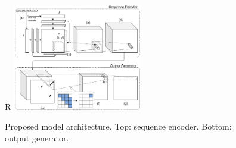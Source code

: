 \documentclass{article}
\begin{document}





%


%
%
%
%



\begin{figure}{R}
        \centering
        \includegraphics[width=0.5\textwidth]{plot/nn_arch_1.pdf}
        \caption{Proposed model architecture. Top: sequence encoder. Bottom: output generator.}
        \vspace{-8em}
        \label{fig:nn_arch_1}
        \centering
\end{figure}
\end{document}
